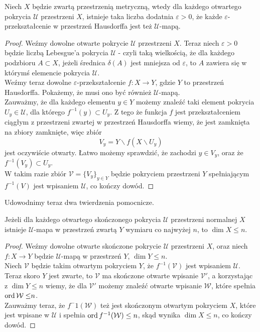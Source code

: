 \begin{twie}
    \label{twie:map_a_prze}
    Niech $X$ będzie zwartą przestrzenią metryczną, wtedy dla każdego otwartego pokrycia $\mathcal{U}$ przestrzeni $X$, istnieje taka liczba dodatnia $\varepsilon>0$, że każde $\varepsilon$-przekształcenie w przestrzeń Hausdorffa jest też $\mathcal{U}$-mapą.
\end{twie}
\begin{proof}
    Weźmy dowolne otwarte pokrycie $\mathcal{U}$ przestrzeni $X$. Teraz niech $\varepsilon>0$ będzie liczbą Lebesgue'a pokrycia $\mathcal{U}$ - czyli taką wielkością, że dla każdego podzbioru $A\subset X$, jeżeli średnica $\delta(A)$ jest mniejsza od $\varepsilon$, to $A$ zawiera się w którymś elemencie pokrycia $\mathcal{U}$.\\
    Weźmy teraz dowolne $\varepsilon$-przekształcenie $f:X\rightarrow Y$, gdzie $Y$ to przestrzeń Hausdorffa. Pokażemy, że musi ono być również $\mathcal{U}$-mapą.\\
    Zauważmy, że dla każdego elementu $y\in Y$ możemy znaleźć taki element pokrycia $U_y\in \mathcal{U}$, dla którego $f^{-1}(y)\subset U_y$. Z tego że funkcja $f$ jest przekształceniem ciągłym z przestrzeni zwartej w przestrzeń Hausdorffa wiemy, że jest zamknięta na zbiory zamknięte, więc zbiór
    \[V_y = Y\backslash f(X\backslash U_y)\]
    jest oczywiście otwarty. Łatwo możemy sprawdzić, że zachodzi $y\in V_y$, oraz że $f^{-1}(V_y)\subset U_y$. \\
    W takim razie zbiór $\mathcal{V} = \{V_y\}_{y\in Y}$ będzie pokryciem przestrzeni $Y$ spełniającym $f^{-1}(V)$ jest wpisaniem $\mathcal{U}$, co kończy dowód.
\end{proof}
Udowodnimy teraz dwa twierdzenia pomocnicze. 
\begin{twie} %
    \label{twie:1_10_11}
    Jeżeli dla każdego otwartego skończonego pokrycia $\mathcal{U}$ przestrzeni normalnej $X$ istnieje $\mathcal{U}$-mapa w przestrzeń zwartą $Y$ wymiaru co najwyżej $n$, to $\dim X\le n$.
\end{twie}  
\begin{proof}
    Weźmy dowolne otwarte skończone pokrycie $\mathcal{U}$ przestrzeni $X$, oraz niech $f:X\rightarrow Y$ będzie $\mathcal{U}$-mapą w przestrzeń $Y$, $\dim Y\le n$.\\
    Niech $\mathcal{V}$ będzie takim otwartym pokryciem $Y$, że $f^{-1}(\mathcal{V})$ jest wpisaniem $\mathcal{U}$. Teraz skoro $Y$ jest zwarte, to $\mathcal{V}$ ma skończone otwarte wpisanie $\mathcal{V'}$, a korzystając z $\dim Y\le n$ wiemy, że dla $\mathcal{V'}$ możemy znaleźć otwarte wpisanie $\mathcal{W}$, które spełnia $\operatorname{ord} \mathcal{W\le }n$. \\
    Zauważmy teraz, że $f^-1(\mathcal{W})$ też jest skończonym otwartym pokryciem $X$, które jest wpisane w $\mathcal{U}$ i spełnia $\operatorname{ord} f^{-1}(\mathcal{W})\le n$, skąd wynika $\dim X \le n$, co kończy dowód.
\end{proof}


